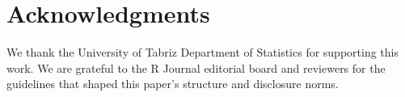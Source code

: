 \section{Acknowledgments}

We thank the University of Tabriz Department of Statistics for
supporting this work. We are grateful to the R Journal editorial board
and reviewers for the guidelines that shaped this paper's structure and
disclosure norms.



\address{Mohamad Yamen Al Mohamad\\
  Department of Statistics, Faculty of Mathematics, Statistics, and Computer Sciences, University of Tabriz\\
  Tabriz\\
  Iran\\
  }

\address{Ali Akbar Heydari\\
  Department of Statistics, Faculty of Mathematics, Statistics, and Computer Sciences, University of Tabriz\\
  Tabriz\\
  Iran\\
  }

\address{Hossein Jabbari Khamnei\\
  Department of Statistics, Faculty of Mathematics, Statistics, and Computer Sciences, University of Tabriz\\
  Tabriz\\
  Iran\\
  }
